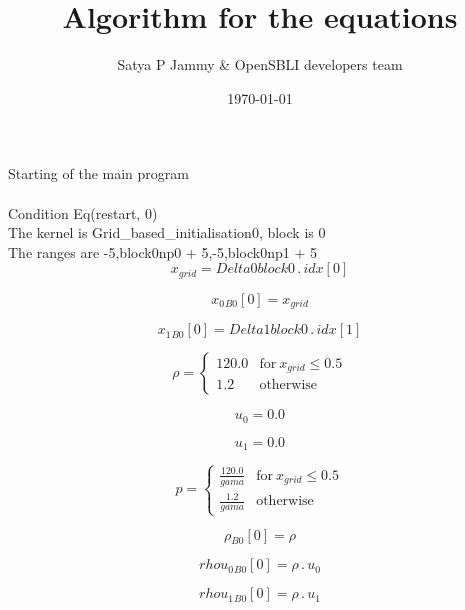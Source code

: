 \documentclass{article}
\title{Algorithm for the equations}
\author{Satya P Jammy \& OpenSBLI developers team}
\date{\today}
\begin{document}
\maketitle
\noindent Starting of the main program\\
\\\noindent Condition Eq(restart, 0)\\\noindent The kernel is Grid_based_initialisation0, block is 0\\\noindent The ranges are -5,block0np0 + 5,-5,block0np1 + 5\\\begin{dmath}x_{grid} = Delta0block0 \,.\, {idx}[{0}]\end{dmath}

\begin{dmath}{x_{0}{_{B0}}}[{0}] = x_{grid}\end{dmath}

\begin{dmath}{x_{1}{_{B0}}}[{0}] = Delta1block0 \,.\, {idx}[{1}]\end{dmath}

\begin{dmath}\rho = \begin{cases} 120.0 & \text{for}\: x_{grid} \leq 0.5 \\1.2 & \text{otherwise} \end{cases}\end{dmath}

\begin{dmath}u_{0} = 0.0\end{dmath}

\begin{dmath}u_{1} = 0.0\end{dmath}

\begin{dmath}p = \begin{cases} \frac{120.0}{gama} & \text{for}\: x_{grid} \leq 0.5 \\\frac{1.2}{gama} & \text{otherwise} \end{cases}\end{dmath}

\begin{dmath}{\rho{_{B0}}}[{0}] = \rho\end{dmath}

\begin{dmath}{rhou_{0}{_{B0}}}[{0}] = \rho \,.\, u_{0}\end{dmath}

\begin{dmath}{rhou_{1}{_{B0}}}[{0}] = \rho \,.\, u_{1}\end{dmath}
\end{document}
